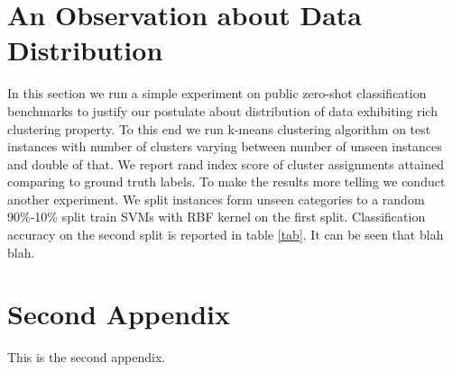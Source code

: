 \documentclass[wcp]{jmlr}
\begin{document}

%


\appendix

\section{An Observation about Data Distribution}\label{observation}
In this section we run a simple experiment on public zero-shot classification benchmarks to justify our
postulate about distribution of data exhibiting rich clustering property. To this end we run k-means clustering
algorithm on test instances with number of clusters varying between number of unseen instances and double of that.
We report rand index score of cluster assignments attained comparing to ground truth labels.
To make the results more telling we conduct another experiment. We split instances form unseen categories
to a random 90\%-10\% split train SVMs with RBF kernel on the first split. Classification accuracy on the second split is reported in table \ref{tab}.
It can be seen that blah blah.%

\section{Second Appendix}\label{apd:second}

This is the second appendix.
\end{document}
